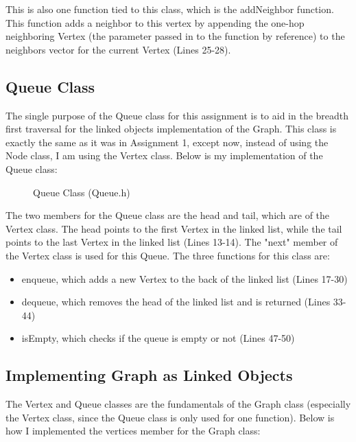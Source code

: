 \documentclass[letterpaper, 10pt]{article}
\begin{document}
\vspace{1em}

\noindent
This is also one function tied to this class, which is the addNeighbor function. This function adds a neighbor to this vertex by appending the one-hop neighboring Vertex (the parameter passed in to the function by reference) to the neighbors vector for the current Vertex (Lines 25-28).

\subsection{Queue Class}
\noindent
The single purpose of the Queue class for this assignment is to aid in the breadth first traversal for the linked objects implementation of the Graph. This class is exactly the same as it was in Assignment 1, except now, instead of using the Node class, I am using the Vertex class. Below is my implementation of the Queue class:

\begin{figure}[H]
  \centering
   
  \label{fig:figure2.11-part1}
\end{figure}

\begin{figure}[H]
  \centering
   
  \caption{Queue Class (Queue.h)}
  \label{fig:figure2.11-part2}
\end{figure}

\noindent
The two members for the Queue class are the head and tail, which are of the Vertex class. The head points to the first Vertex in the linked list, while the tail points to the last Vertex in the linked list (Lines 13-14). The "next" member of the Vertex class is used for this Queue. The three functions for this class are:
\begin{itemize}
    \item enqueue, which adds a new Vertex to the back of the linked list (Lines 17-30)
    \item dequeue, which removes the head of the linked list and is returned (Lines 33-44)
    \item isEmpty, which checks if the queue is empty or not (Lines 47-50) 
\end{itemize}

\subsection{Implementing Graph as Linked Objects}
\noindent
The Vertex and Queue classes are the fundamentals of the Graph class (especially the Vertex class, since the Queue class is only used for one function). Below is how I implemented the vertices member for the Graph class:
\end{document}
